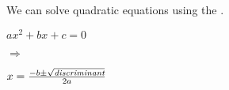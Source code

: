 We can solve quadratic equations using 
the  .

\hfill
\begin{minipage}{0.3\textwidth}
    \raggedleft
    \large
    $ax^2 + bx + c = 0$
\end{minipage}
\hfill
{
    \large $\Rightarrow$
}
\hfill
\begin{minipage}{0.3\textwidth}
    \raggedright
    \large
    \(
        x = \frac
            {-b \pm \sqrt{\text{\itshape discriminant}}}
            {2a}
    \)
\end{minipage}
\hfill\,
